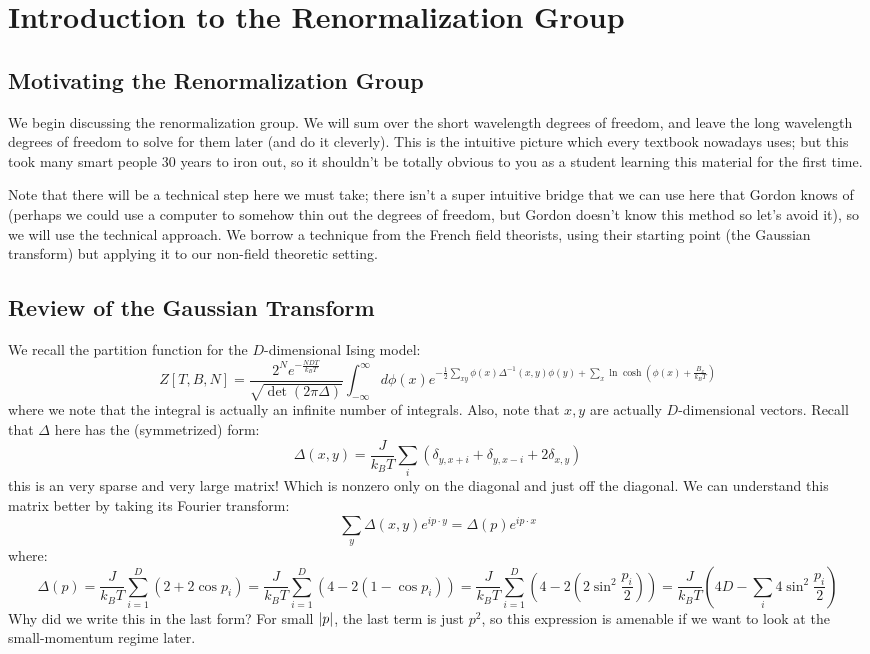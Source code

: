 \section{Introduction to the Renormalization Group}
\subsection{Motivating the Renormalization Group}
We begin discussing the renormalization group. We will sum over the short wavelength degrees of freedom, and leave the long wavelength degrees of freedom to solve for them later (and do it cleverly). This is the intuitive picture which every textbook nowadays uses; but this took many smart people 30 years to iron out, so it shouldn't be totally obvious to you as a student learning this material for the first time.

Note that there will be a technical step here we must take; there isn't a super intuitive bridge that we can use here that Gordon knows of (perhaps we could use a computer to somehow thin out the degrees of freedom, but Gordon doesn't know this method so let's avoid it), so we will use the technical approach. We borrow a technique from the French field theorists, using their starting point (the Gaussian transform) but applying it to our non-field theoretic setting.

\subsection{Review of the Gaussian Transform}
We recall the partition function for the $D$-dimensional Ising model:
\begin{equation}\label{eq-Isingpartition}
    Z[T, B, N] = \frac{2^Ne^{-\frac{NDT}{k_B T}}}{\sqrt{\det(2\pi\Delta)}}\int_{-\infty}^\infty d\phi(x) e^{-\frac{1}{2}\sum_{xy}\phi(x)\Delta^{-1}(x, y)\phi(y) + \sum_x \ln\cosh(\phi(x) + \frac{B_x}{k_B T})}
\end{equation}
where we note that the integral is actually an infinite number of integrals. Also, note that $x, y$ are actually $D$-dimensional vectors. Recall that $\Delta$ here has the (symmetrized) form:
\begin{equation}
    \Delta(x,y) = \frac{J}{k_B T}\sum_i (\delta_{y, x + i} + \delta_{y, x-i} + 2\delta_{x, y})
\end{equation}
this is an very sparse and very large matrix! Which is nonzero only on the diagonal and just off the diagonal. We can understand this matrix better by taking its Fourier transform:
\begin{equation}
    \sum_y \Delta(x, y)e^{ip \cdot y} = \Delta(p)e^{ip\cdot x}
\end{equation}
where:
\begin{equation}
    \Delta(p) = \frac{J}{k_B T}\sum_{i=1}^D (2 + 2\cos p_i) = \frac{J}{k_B T}\sum_{i=1}^D (4 - 2(1 - \cos p_i)) = \frac{J}{k_B T}\sum_{i=1}^D (4 - 2(2\sin^2\frac{p_i}{2})) = \frac{J}{k_BT}\left(4D - \sum_i 4\sin^2\frac{p_i}{2}\right)
\end{equation}
Why did we write this in the last form? For small $\lvert p \rvert$, the last term is just $p^2$, so this expression is amenable if we want to look at the small-momentum regime later.

